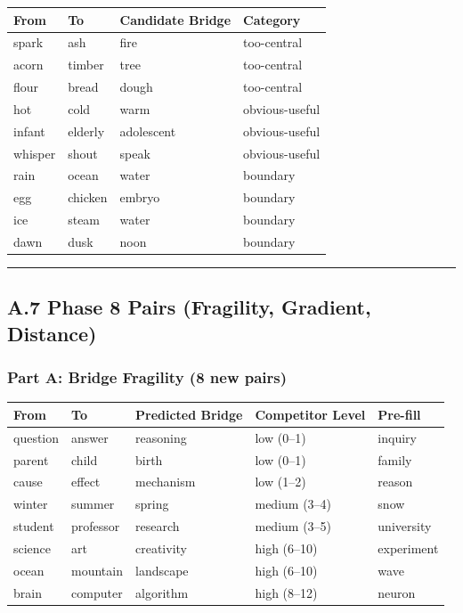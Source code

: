\begin{longtable}[]{@{}llll@{}}
\toprule\noalign{}
From & To & Candidate Bridge & Category \\
\midrule\noalign{}
\endhead
\bottomrule\noalign{}
\endlastfoot
spark & ash & fire & too-central \\
acorn & timber & tree & too-central \\
flour & bread & dough & too-central \\
hot & cold & warm & obvious-useful \\
infant & elderly & adolescent & obvious-useful \\
whisper & shout & speak & obvious-useful \\
rain & ocean & water & boundary \\
egg & chicken & embryo & boundary \\
ice & steam & water & boundary \\
dawn & dusk & noon & boundary \\
\end{longtable}

\begin{center}\rule{0.5\linewidth}{0.5pt}\end{center}

\subsection{A.7 Phase 8 Pairs (Fragility, Gradient, Distance)}\label{a.7-phase-8-pairs-fragility-gradient-distance}

\subsubsection{Part A: Bridge Fragility (8 new pairs)}\label{part-a-bridge-fragility-8-new-pairs}

\begin{longtable}[]{@{}lllll@{}}
\toprule\noalign{}
From & To & Predicted Bridge & Competitor Level & Pre-fill \\
\midrule\noalign{}
\endhead
\bottomrule\noalign{}
\endlastfoot
question & answer & reasoning & low (0--1) & inquiry \\
parent & child & birth & low (0--1) & family \\
cause & effect & mechanism & low (1--2) & reason \\
winter & summer & spring & medium (3--4) & snow \\
student & professor & research & medium (3--5) & university \\
science & art & creativity & high (6--10) & experiment \\
ocean & mountain & landscape & high (6--10) & wave \\
brain & computer & algorithm & high (8--12) & neuron \\
\end{longtable}

